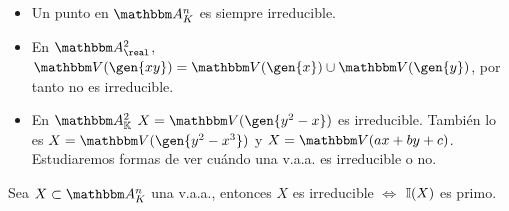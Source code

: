 \begin{example}
	\begin{itemize}
	\item Un punto en $\A_K^n$ es siempre irreducible.
	\item En $\A^2_{\real}$, $\V(\gen{xy})=\V(\gen{x}) \cup \V(\gen{y})$, por tanto no es irreducible.
	\item En $\A^2_{\K}$ $X=\V(\gen{y^2-x})$ es irreducible. También lo es $X=\V(\gen{y^2-x^3})$ y $X=\V(ax+by+c)$. Estudiaremos formas de ver cuándo una v.a.a. es irreducible o no.
	\end{itemize}
\end{example}

\begin{prop}
	Sea $X \subset \A_K^n$ una v.a.a., entonces $X$ es irreducible $\Leftrightarrow$ $\mathbb{I}(X)$ es primo.
\end{prop}

